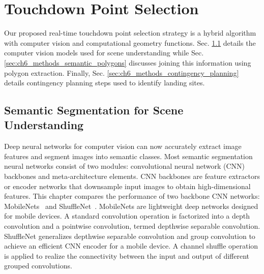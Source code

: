 \section{Touchdown Point Selection}\label{sec:ch6_touchdown_point_selection}

Our proposed real-time touchdown point selection strategy is a hybrid algorithm with computer vision and computational geometry functions. Sec. \ref{sec:ch6_methods_semantic_segmentation} details the computer vision models used for scene understanding while Sec. \ref{sec:ch6_methods_semantic_polygons} discusses joining this information using polygon extraction. Finally, Sec. \ref{sec:ch6_methods_contingency_planning} details contingency planning steps used to identify landing sites.


\subsection{Semantic Segmentation for Scene Understanding}\label{sec:ch6_methods_semantic_segmentation}

Deep neural networks for computer vision can now accurately extract image features and segment images into semantic classes. Most semantic segmentation neural networks consist of two modules: convolutional neural network (CNN) backbones and meta-architecture elements.
CNN backbones are feature extractors or encoder networks that downsample input images to obtain high-dimensional features. This chapter compares the performance of two backbone CNN networks: MobileNets~\cite{howard_mobilenets_2017} and ShuffleNet~\cite{zhang_shufflenet_2018}. MobileNets are lightweight deep networks designed for mobile devices. A standard convolution operation is factorized into a depth convolution and a pointwise convolution, termed depthwise separable convolution. ShuffleNet generalizes depthwise separable convolution and group convolution to achieve an efficient CNN encoder for a mobile device. A channel shuffle operation is applied to realize the connectivity between the input and output of different grouped convolutions.

